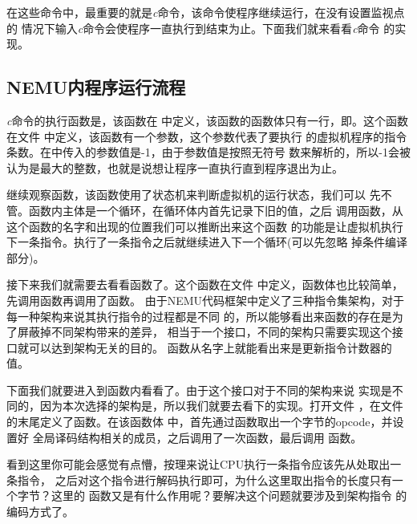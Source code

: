 在这些命令中，最重要的就是\emph{c}命令，该命令使程序继续运行，在没有设置监视点的
情况下输入\emph{c}命令会使程序一直执行到结束为止。下面我们就来看看\emph{c}命令
的实现。

\subsection{NEMU内程序运行流程}
\emph{c}命令的执行函数是，该函数在
中定义，该函数的函数体只有一行，即。这个函数在文件
中定义，该函数有一个参数，这个参数代表了要执行
的虚拟机程序的指令条数。在中传入的参数值是-1，由于参数值是按照无符号
数来解析的，所以-1会被认为是最大的整数，也就是说想让程序一直执行直到程序退出为止。


继续观察函数，该函数使用了状态机来判断虚拟机的运行状态，我们可以
先不管。函数内主体是一个循环，在循环体内首先记录下旧的\pc 值，之后
调用函数，从这个函数的名字和出现的位置我们可以推断出来这个函数
的功能是让虚拟机执行下一条指令。执行了一条指令之后就继续进入下一个循环(可以先忽略
掉条件编译部分)。

接下来我们就需要去看看函数了。这个函数在文件
中定义，函数体也比较简单，先调用函数再调用了函数。
由于NEMU代码框架中定义了三种指令集架构，对于每一种架构来说其执行指令的过程都是不同
的，所以能够看出来函数的存在是为了屏蔽掉不同架构带来的差异，
相当于一个接口，不同的架构只需要实现这个接口就可以达到架构无关的目的。
函数从名字上就能看出来是更新指令计数器\pc 的值。

下面我们就要进入到函数内看看了。由于这个接口对于不同的架构来说
实现是不同的，因为本次选择的架构是\arch，所以我们就要去看\arch 下的实现。打开文件
，在文件的末尾定义了函数。在该函数体
中，首先通过函数取出一个字节的opcode，并设置好
全局译码结构相关的成员，之后调用了一次函数，最后调用
函数。

看到这里你可能会感觉有点懵，按理来说让CPU执行一条指令应该先从\pc 处取出一条指令，
之后对这个指令进行解码执行即可，为什么这里取出指令的长度只有一个字节？这里的
函数又是有什么作用呢？要解决这个问题就要涉及到\arch 架构指令
的编码方式了。
